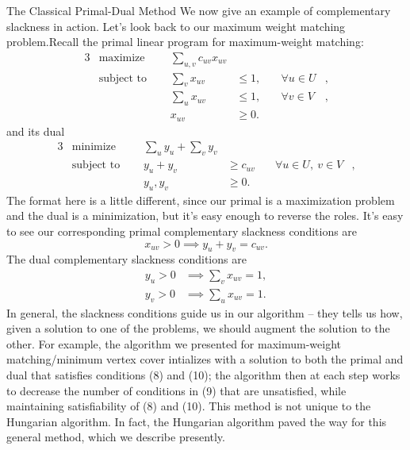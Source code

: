 \begin{section}{The Classical Primal-Dual Method}
	We now give an example of complementary slackness in action. Let's look back to our maximum 
	weight matching problem.Recall the primal linear program for maximum-weight matching:
	\begin{alignat}{3}
		& \text{maximize } & \sum_{u,v} c_{uv} x_{uv}& \\
		& \text{subject to } \quad & \sum_{v} x_{uv} & \leq 1, & \quad \forall u\in U&, \\
				     &\quad & \sum_{u} x_{uv} & \leq 1, & \quad \forall v\in V &, \\
				&& x_{uv} & \geq 0.
	\end{alignat}
	and its dual
	\begin{alignat}{3}
		& \text{minimize } & \sum_u y_u + \sum_v y_v& \\
		& \text{subject to } \quad & y_u + y_v & \geq c_{uv} & \quad \forall 
					u\in U,\ v\in V &, \\
				    && y_u,y_v & \geq 0.
	\end{alignat}
	The format here is a little different, since our primal is a maximization problem and the dual 
	is a minimization, but it's easy enough to reverse the roles. It's easy to see our 
	corresponding primal complementary slackness conditions are
	\begin{equation}
		x_{uv} > 0 \implies y_u + y_v = c_{uv}.
	\end{equation}
	The dual complementary slackness conditions are
	\begin{align}
		y_u > 0 &\implies \sum_v x_{uv} = 1,\\
		y_v > 0 &\implies \sum_u x_{uv} = 1.
	\end{align}
	In general, the slackness conditions guide us in our algorithm -- they tells us how, given a 
	solution to one of the problems, we should augment the solution to the other. For example, the 
	algorithm we presented for maximum-weight matching/minimum vertex cover intializes with 
	a solution to both the primal and dual that satisfies conditions (8) and (10); the algorithm 
	then at each step works to decrease the number of conditions in (9) that are unsatisfied, while 
	maintaining satisfiability of (8) and (10). This method is not unique to the Hungarian 
	algorithm. In fact, the Hungarian algorithm paved the way for this general method, which we 
	describe presently.


\end{section}
